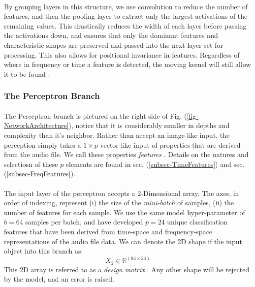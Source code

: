 \documentclass[12pt,letterpaper]{article}
\begin{document}
\paragraph*{}By grouping layers in this structure, we use convolution to reduce the number of features, and then the pooling layer to extract only the largest activations of the remaining values. This drastically reduces the width of each layer before passing the activations down, and ensures that only the dominant features and characteristic shapes are preserved and passed into the next layer set for processing. This also allows for positional invariance in features. Regardless of where in frequency or time a feature is detected, the moving kernel will still allow it to be found \cite{Goodfellow,Loy}.


\subsubsection{The Perceptron Branch}

\paragraph*{} The Perceptron branch is pictured on the right side of Fig. (\ref{fig-NetworkArchitecture}), notice that it is considerably smaller in depths and complexity than it's neighbor. Rather than accept an image-like input, the perception simply takes a $1 \times p$ vector-like input of properties that are derived from the audio file. We call these properties \textit{features} \cite{Geron,Khan,Serizel}. Details on the natures and selectiosn of these $p$ elements are found in sec. (\ref{subsec-TimeFeatures}) and sec. (\ref{subsec-FreqFeatures}).

\paragraph*{}The input layer of the perceptron accepts a 2-Dimensional array. The axes, in order of indexing, represent (i) the size of the \textit{mini-batch} of samples, (ii) the number of features for each sample. We use the same model hyper-parameter of $b = 64$ samples per batch, and have developed $p = 24$ unique classification features that have been derived from time-space and frequency-space representations of the audio file data. We can denote the 2D shape if the input object into this branch as:
\begin{equation}
\label{eqn-shapeX2}
X_2 \in \mathbb{R}^{(64 \times 24)}
\end{equation}
This 2D array is referred to as a \textit{design matrix} \cite{James,Loy}. Any other shape will be rejected by the model, and an error is raised.
\end{document}
